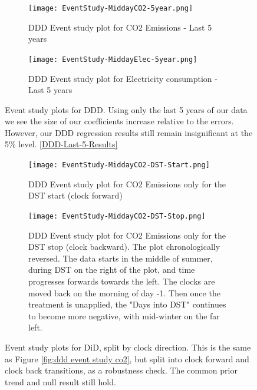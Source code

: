 \begin{figure}[ht]
    \centering
    \begin{subfigure}[t]{0.45\textwidth} 
        \texttt{[image: EventStudy-MiddayCO2-5year.png]}
        \caption{\acs{DDD} Event study plot for CO2 Emissions - Last 5 years}
        \label{fig:ddd event study co2 - Last 5}
    \end{subfigure}
    \hfill 
    \begin{subfigure}[t]{0.45\textwidth} 
        \texttt{[image: EventStudy-MiddayElec-5year.png]} 
        \caption{\acs{DDD} Event study plot for Electricity consumption - Last 5 years} %
        \label{fig:ddd event study elec - Last 5}
    \end{subfigure}
    \caption[Event study plots for \acs{DDD} using last 5 years]{Event study plots for \acs{DDD}. Using only the last 5 years of our data we see the size of our coefficients increase relative to the errors. However, our DDD regression results still remain insignificant at the 5\% level. \ref{DDD-Last-5-Results}} 
    \label{fig:ddd event study - Last 5}
\end{figure}

\begin{figure}[ht]
    \centering
    \begin{subfigure}[t]{0.45\textwidth} 
        \texttt{[image: EventStudy-MiddayCO2-DST-Start.png]}
        \caption{\acs{DDD} Event study plot for CO2 Emissions only for the DST start (clock forward)}
        \label{fig:ddd event study co2 start}
    \end{subfigure}
    \hfill 
    \begin{subfigure}[t]{0.45\textwidth} 
        \texttt{[image: EventStudy-MiddayCO2-DST-Stop.png]}
        \caption{\acs{DDD} Event study plot for CO2 Emissions only for the DST stop (clock backward). The plot chronologically reversed. The data starts in the middle of summer, during \acs{DST} on the right of the plot, and time progresses forwards towards the left. The clocks are moved back on the morning of day -1. Then once the treatment is unapplied, the "Days into \acs{DST}" continues to become more negative, with mid-winter on the far left.} %
        \label{fig:ddd event study co2 stop}
    \end{subfigure}
    \caption[Event study plots for \acs{DiD} split by clock change direction]{Event study plots for \acs{DiD}, split by clock direction. This is the same as Figure \ref{fig:ddd event study co2}, but split into clock forward and clock back transitions, as a robustness check. The common prior trend and null result still hold.} 
    \label{fig:ddd event study co2 start stop}
\end{figure}

